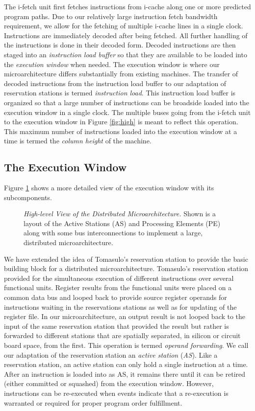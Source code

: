 \documentclass[10pt,dvips]{article}
\begin{document}
The i-fetch unit first fetches instructions from i-cache
along one or more predicted program paths.
Due to our relatively large instruction fetch bandwidth
requirement, we allow for the fetching of multiple i-cache
lines in a single clock.
Instructions are immediately
decoded after being fetched.
All further handling of the instructions is done in their decoded
form.
Decoded instructions are then staged
into an \textit{instruction load buffer}
so that they are available to be loaded 
into the \textit{execution window} when needed.  
The execution window is where
our microarchitecture differs substantially from existing machines.
The transfer of decoded instructions from the instruction load buffer 
to our adaptation of
reservation stations is termed \textit{instruction load}.
This instruction load buffer is organized so that
a large number of instructions can be broadside loaded into the
execution window in a single clock.
The multiple buses going from the i-fetch unit to the
execution window in Figure \ref{fig:high} is meant to
reflect this operation.  
This maximum number of instructions loaded into the
execution window at a time is termed
the \textit{column height} of the machine.  
%
%
\subsection{The Execution Window}
%
Figure \ref{fig:window} shows a more detailed view
of the execution window with its subcomponents.
%
\begin{figure}
\centering
{}
\caption{{\em High-level View of the Distributed Microarchitecture.} 
Shown is a layout of the Active Stations (AS) and Processing Elements (PE)
along with some bus interconnections to implement a large,
distributed microarchitecture.}
\label{fig:window}
\end{figure}
%
We have extended the idea of Tomasulo's reservation
station \cite{Tom67} to provide the basic building block for a distributed
microarchitecture.  Tomasulo's reservation station provided for the
simultaneous execution of different instructions over several
functional units.  
Register results from the functional units were placed on
a common data bus and looped back to provide source register operands 
for instructions waiting in the reservations stations as well as
for updating of the register file.  In our microarchitecture,
an output result is not looped back to the input of the same reservation
station
that provided the result but rather is forwarded to different
stations that are spatially separated, in silicon or circuit board space,
from the first.  
This operation is termed \textit{operand forwarding}.
We call our adaptation of the
reservation station an \textit{active station} (\textit{AS}).
Like a reservation station, an active station can only hold a single
instruction at a time.  After an instruction is loaded into
as AS, it remains there until it can be retired 
(either committed or squashed)  
from the execution window.  
However, instructions can be
re-executed when events indicate that
a re-execution is warranted or required for proper program order
fulfillment.
\end{document}
